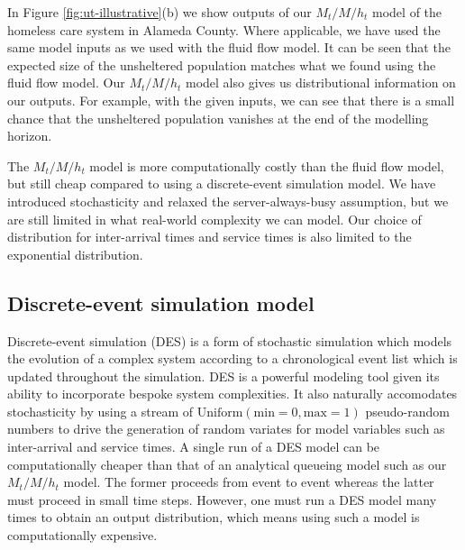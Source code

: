 \documentclass[12pt,a4paper]{article}
\begin{document}
In Figure \ref{fig:ut-illustrative}(b) we show outputs of our $M_t/M/h_t$ model of the homeless care system in Alameda County. Where applicable, we have used the same model inputs as we used with the fluid flow model. It can be seen that the expected size of the unsheltered population matches what we found using the fluid flow model. Our $M_t/M/h_t$ model also gives us distributional information on our outputs. For example, with the given inputs, we can see that there is a small chance that the unsheltered population vanishes at the end of the modelling horizon. 

The $M_t/M/h_t$ model is more computationally costly than the fluid flow model, but still cheap compared to using a discrete-event simulation model. We have introduced stochasticity and relaxed the server-always-busy assumption, but we are still limited in what real-world complexity we can model. Our choice of distribution for inter-arrival times and service times is also limited to the exponential distribution. 
%
\subsection{Discrete-event simulation model} \label{DES}
%
Discrete-event simulation (DES) is a form of stochastic simulation which models the evolution of a complex system according to a chronological event list which is updated throughout the simulation. DES is a powerful modeling tool given its ability to incorporate bespoke system complexities. It also naturally accomodates stochasticity by using a stream of $\text{Uniform}(\text{min} = 0, \text{max} = 1)$ pseudo-random numbers to drive the generation of random variates for model variables such as inter-arrival and service times. A single run of a DES model can be computationally cheaper than that of an analytical queueing model such as our $M_t/M/h_t$ model. The former proceeds from event to event whereas the latter must proceed in small time steps. However, one must run a DES model many times to obtain an output distribution, which means using such a model is computationally expensive.
\end{document}

